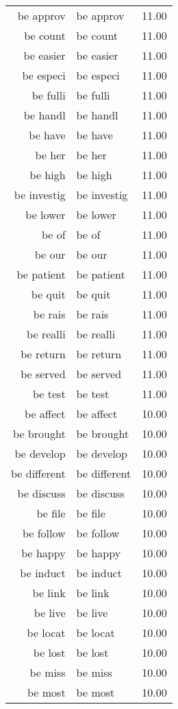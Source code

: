 \begin{table}[ht]
\begin{tabular}{rlr}
  be approv & be approv & 11.00 \\ 
  be count & be count & 11.00 \\ 
  be easier & be easier & 11.00 \\ 
  be especi & be especi & 11.00 \\ 
  be fulli & be fulli & 11.00 \\ 
  be handl & be handl & 11.00 \\ 
  be have & be have & 11.00 \\ 
  be her & be her & 11.00 \\ 
  be high & be high & 11.00 \\ 
  be investig & be investig & 11.00 \\ 
  be lower & be lower & 11.00 \\ 
  be of & be of & 11.00 \\ 
  be our & be our & 11.00 \\ 
  be patient & be patient & 11.00 \\ 
  be quit & be quit & 11.00 \\ 
  be rais & be rais & 11.00 \\ 
  be realli & be realli & 11.00 \\ 
  be return & be return & 11.00 \\ 
  be served & be served & 11.00 \\ 
  be test & be test & 11.00 \\ 
  be affect & be affect & 10.00 \\ 
  be brought & be brought & 10.00 \\ 
  be develop & be develop & 10.00 \\ 
  be different & be different & 10.00 \\ 
  be discuss & be discuss & 10.00 \\ 
  be file & be file & 10.00 \\ 
  be follow & be follow & 10.00 \\ 
  be happy & be happy & 10.00 \\ 
  be induct & be induct & 10.00 \\ 
  be link & be link & 10.00 \\ 
  be live & be live & 10.00 \\ 
  be locat & be locat & 10.00 \\ 
  be lost & be lost & 10.00 \\ 
  be miss & be miss & 10.00 \\ 
  be most & be most & 10.00 \\ 

\end{tabular}
\end{table}
